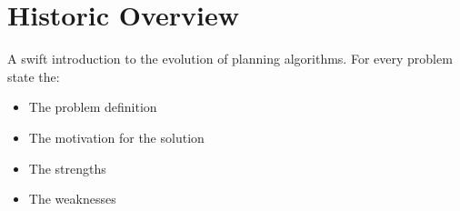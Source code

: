 \documentclass[runningheads,a4paper]{llncs}
\begin{document}
\section{Historic Overview}
A swift introduction to the evolution of planning algorithms. For every problem state the:
\begin{itemize}
	\item The problem definition
	\item The motivation for the solution
	\item The strengths
	\item The weaknesses
\end{itemize}

%
%
%
%
%
%
%
%
%
\end{document}
